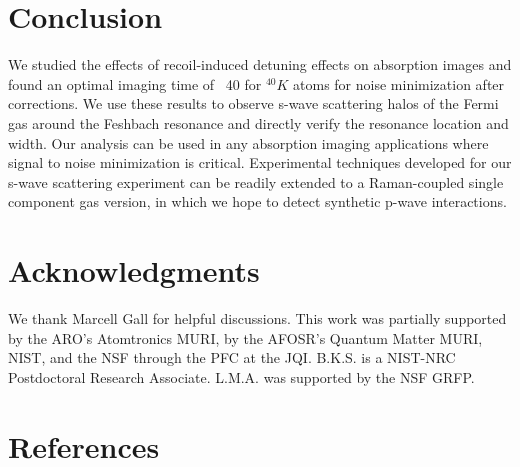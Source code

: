 \documentclass[12pt]{iopart}
\begin{document}
\section{Conclusion}
We studied the effects of recoil-induced detuning effects on absorption images and found an optimal imaging time of ~40\us{} for $^{40}K$ atoms for noise minimization after corrections. We use these results to observe s-wave scattering halos of the Fermi gas around the Feshbach resonance and directly verify the resonance location and width. Our analysis can be used in any absorption imaging applications where signal to noise minimization is critical. Experimental techniques developed for our s-wave scattering experiment can be readily extended to a Raman-coupled single component gas version, in which we hope to detect synthetic p-wave interactions. 
\section*{Acknowledgments}
We thank Marcell Gall for helpful discussions. This work was partially supported by the ARO’s Atomtronics MURI, by the
AFOSR’s Quantum Matter MURI, NIST, and the NSF through the PFC at the JQI. B.K.S. is
a NIST-NRC Postdoctoral Research Associate. L.M.A. was supported by the NSF GRFP.

\section*{References}
{}

\end{document}
